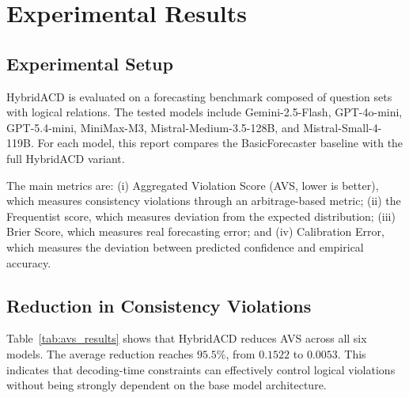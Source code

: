 \documentclass[pdflatex,sn-mathphys-num]{sn-jnl}
\begin{document}
\section{Experimental Results}\label{sec:results}

\subsection{Experimental Setup}

HybridACD is evaluated on a forecasting benchmark composed of question sets with logical relations. The tested models include Gemini-2.5-Flash, GPT-4o-mini, GPT-5.4-mini, MiniMax-M3, Mistral-Medium-3.5-128B, and Mistral-Small-4-119B. For each model, this report compares the BasicForecaster baseline with the full HybridACD variant.

The main metrics are: (i) Aggregated Violation Score (AVS, lower is better), which measures consistency violations through an arbitrage-based metric; (ii) the Frequentist score, which measures deviation from the expected distribution; (iii) Brier Score, which measures real forecasting error; and (iv) Calibration Error, which measures the deviation between predicted confidence and empirical accuracy.

\subsection{Reduction in Consistency Violations}

Table~\ref{tab:avs_results} shows that HybridACD reduces AVS across all six models. The average reduction reaches $95.5\%$, from $0.1522$ to $0.0053$. This indicates that decoding-time constraints can effectively control logical violations without being strongly dependent on the base model architecture.
\end{document}
